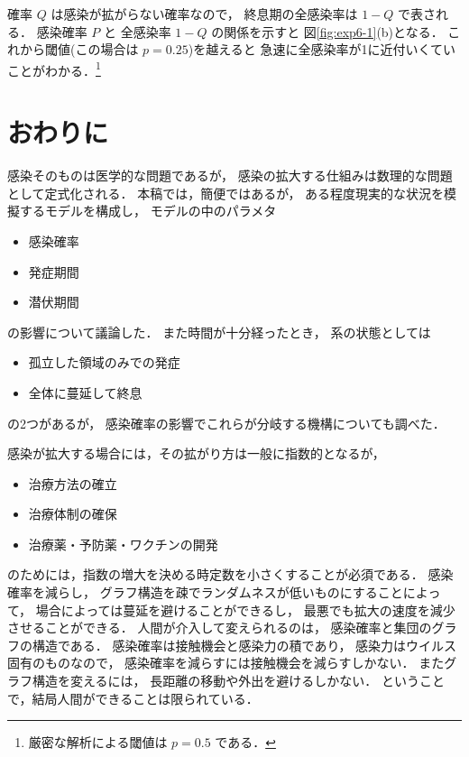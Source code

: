 \documentclass[10pt,oneside]{scrartcl}
\begin{document}
確率 \(Q\) は感染が拡がらない確率なので，
終息期の全感染率は \(1-Q\) で表される．
感染確率 \(P\) と 
全感染率 \(1-Q\) の関係を示すと
図\ref{fig:exp6-1}(b)となる．
これから閾値(この場合は \(p=0.25\))を越えると
急速に全感染率が1に近付いくていことがわかる．\footnote{厳密な解析による閾値は \(p=0.5\) である．}

\section{おわりに}
\label{sec:orgbd23079}

感染そのものは医学的な問題であるが，
感染の拡大する仕組みは数理的な問題として定式化される．
本稿では，簡便ではあるが，
ある程度現実的な状況を模擬するモデルを構成し，
モデルの中のパラメタ
\begin{itemize}
\item 感染確率
\item 発症期間
\item 潜伏期間
\end{itemize}
の影響について議論した．
また時間が十分経ったとき，
系の状態としては
\begin{itemize}
\item 孤立した領域のみでの発症
\item 全体に蔓延して終息
\end{itemize}
の2つがあるが，
感染確率の影響でこれらが分岐する機構についても調べた．

感染が拡大する場合には，その拡がり方は一般に指数的となるが，
\begin{itemize}
\item 治療方法の確立
\item 治療体制の確保
\item 治療薬・予防薬・ワクチンの開発
\end{itemize}
のためには，指数の増大を決める時定数を小さくすることが必須である．
感染確率を減らし，
グラフ構造を疎でランダムネスが低いものにすることによって，
場合によっては蔓延を避けることができるし，
最悪でも拡大の速度を減少させることができる．
人間が介入して変えられるのは，
感染確率と集団のグラフの構造である．
感染確率は接触機会と感染力の積であり，
感染力はウイルス固有のものなので，
感染確率を減らすには接触機会を減らすしかない．
またグラフ構造を変えるには，
長距離の移動や外出を避けるしかない．
ということで，結局人間ができることは限られている．
\end{document}
